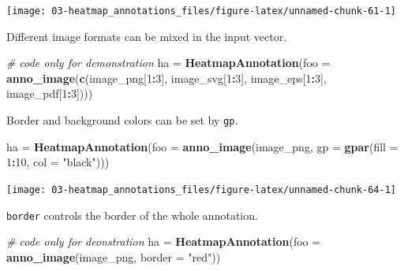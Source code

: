 \documentclass[]{book}
\newenvironment{Shaded}{\begin{snugshade}}{\end{snugshade}}
\newcommand{\KeywordTok}[1]{\textcolor[rgb]{0.13,0.29,0.53}{\textbf{#1}}}
\newcommand{\DataTypeTok}[1]{\textcolor[rgb]{0.13,0.29,0.53}{#1}}
\newcommand{\DecValTok}[1]{\textcolor[rgb]{0.00,0.00,0.81}{#1}}
\newcommand{\StringTok}[1]{\textcolor[rgb]{0.31,0.60,0.02}{#1}}
\newcommand{\CommentTok}[1]{\textcolor[rgb]{0.56,0.35,0.01}{\textit{#1}}}
\newcommand{\OperatorTok}[1]{\textcolor[rgb]{0.81,0.36,0.00}{\textbf{#1}}}
\newcommand{\NormalTok}[1]{#1}
\theoremstyle{definition}
\theoremstyle{definition}
\theoremstyle{definition}
\theoremstyle{remark}
\begin{document}
\begin{center}\texttt{[image: 03-heatmap\_annotations\_files/figure-latex/unnamed-chunk-61-1]} \end{center}

Different image formats can be mixed in the input vector.

\begin{Shaded}
\begin{Highlighting}[]
\CommentTok{# code only for demonstration}
\NormalTok{ha =}\StringTok{ }\KeywordTok{HeatmapAnnotation}\NormalTok{(}\DataTypeTok{foo =} \KeywordTok{anno_image}\NormalTok{(}\KeywordTok{c}\NormalTok{(image_png[}\DecValTok{1}\OperatorTok{:}\DecValTok{3}\NormalTok{], image_svg[}\DecValTok{1}\OperatorTok{:}\DecValTok{3}\NormalTok{], }
\NormalTok{    image_eps[}\DecValTok{1}\OperatorTok{:}\DecValTok{3}\NormalTok{], image_pdf[}\DecValTok{1}\OperatorTok{:}\DecValTok{3}\NormalTok{])))}
\end{Highlighting}
\end{Shaded}

Border and background colors can be set by \texttt{gp}.

\begin{Shaded}
\begin{Highlighting}[]
\NormalTok{ha =}\StringTok{ }\KeywordTok{HeatmapAnnotation}\NormalTok{(}\DataTypeTok{foo =} \KeywordTok{anno_image}\NormalTok{(image_png, }
    \DataTypeTok{gp =} \KeywordTok{gpar}\NormalTok{(}\DataTypeTok{fill =} \DecValTok{1}\OperatorTok{:}\DecValTok{10}\NormalTok{, }\DataTypeTok{col =} \StringTok{"black"}\NormalTok{)))}
\end{Highlighting}
\end{Shaded}

\begin{center}\texttt{[image: 03-heatmap\_annotations\_files/figure-latex/unnamed-chunk-64-1]} \end{center}

\texttt{border} controls the border of the whole annotation.

\begin{Shaded}
\begin{Highlighting}[]
\CommentTok{# code only for deonstration}
\NormalTok{ha =}\StringTok{ }\KeywordTok{HeatmapAnnotation}\NormalTok{(}\DataTypeTok{foo =} \KeywordTok{anno_image}\NormalTok{(image_png, }\DataTypeTok{border =} \StringTok{"red"}\NormalTok{))}
\end{Highlighting}
\end{Shaded}
\end{document}

